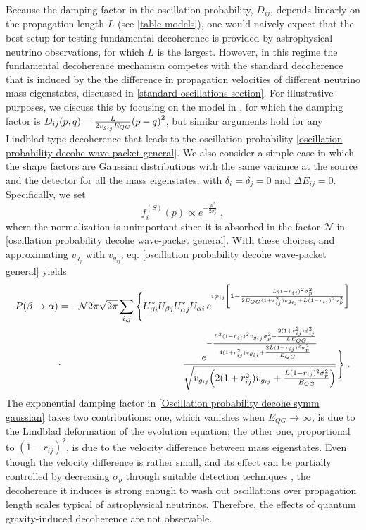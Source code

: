 \documentclass[11pt]{article}
\begin{document}
Because the damping factor in the oscillation probability, $D_{ij}$, depends linearly on the propagation length $L$ (see \cref{table models}), one would naively expect that the best setup for testing fundamental decoherence is provided by astrophysical neutrino observations, for which $L$ is the largest.
However, in this regime the fundamental decoherence mechanism competes with the standard decoherence that is induced by the the difference in propagation velocities of different neutrino mass eigenstates, discussed in \cref{standard oscillations section}. For illustrative purposes, we discuss this by focusing on the model in \cite{Arzano:2022nlo}, for which the damping factor is $D_{ij}(p,q)= \frac{L}{2v_{g_{ij}}E_{QG}}\qty(p-q)^2$, but similar arguments hold for any Lindblad-type decoherence that leads to the oscillation probability \eqref{oscillation probability decohe wave-packet general}. We also consider a simple case in which the shape factors are Gaussian distributions with the same variance at the source and the detector for all the mass eigenstates, with $\delta_i=\delta_j=0$ and $\Delta E_{ij} = 0$. Specifically, we set
\begin{equation}\label{shape factors}
    f_i^{(S)}(p) \propto e^{-\frac{p^2}{2\sigma_p^2}}\;,
\end{equation}
where the normalization is unimportant since it is absorbed in the factor $\mathcal{N}$ in \eqref{oscillation probability decohe wave-packet general}. With these choices, and approximating $v_{g_j}$ with $v_{g_{ij}}$, eq. \eqref{oscillation probability decohe wave-packet general} yields
\begin{eqnarray}
    P(\beta\to\alpha) &=& \mathcal{N} 2\pi\sqrt{2\pi}\sum_{i,j} \Bigg\{U^*_{\beta i} U_{\beta j} U^*_{\alpha j} U_{\alpha i} \, e^{i \phi_{ij}\qty[1-\frac{L(1-r_{ij})^2\sigma_p^2}{2E_{QG}(1+r_{ij}^2)v_{g_{ij}}+L(1-r_{ij})^2\sigma_p^2}]}\nonumber \\ &\cdot&\frac{e^{-\frac{L^2(1-r_{ij})^2v_{g_{ij}}\sigma_p^2+\frac{2(1+r_{ij}^2)\phi_{ij}^2}{LE_{QG}}}{4(1+r_{ij}^2)v_{g_{ij}}+\frac{2L(1-r_{ij})^2\sigma_p^2}{E_{QG}}}}}{\sqrt{v_{g_{ij}}\qty(2(1+r_{ij}^2)v_{g_{ij}}+\frac{L(1-r_{ij})^2\sigma_p^2}{E_{QG}})}}\Bigg\}\;.\label{Oscillation probability decohe symm gaussian}
\end{eqnarray}
The exponential damping factor in \eqref{Oscillation probability decohe symm gaussian} takes two contributions: one, which vanishes when $E_{QG}\to \infty$, is due to the Lindblad deformation of the evolution equation; the other one, proportional to $(1-r_{ij})^2$, is due to the velocity difference between mass eigenstates. Even though the velocity difference is rather small, and its effect can be partially controlled by decreasing $\sigma_p$ through suitable detection techniques \cite{Giunti:1997wq}, the decoherence it induces is strong enough to wash out oscillations over propagation length scales typical of astrophysical neutrinos. Therefore, the effects of quantum gravity-induced decoherence are not observable.
\end{document}
